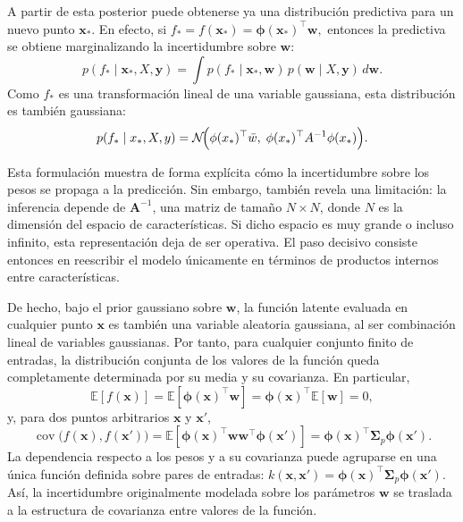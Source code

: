 A partir de esta posterior puede obtenerse ya una distribución predictiva para un nuevo
punto \(\bm{x}_*\). En efecto, si
$
f_* = f(\bm{x}_*)=\bm{\phi}(\bm{x}_*)^\top \bm{w},
$
entonces la predictiva se obtiene marginalizando la incertidumbre sobre \(\bm{w}\):
\[
p(f_*\mid \bm{x}_*,X,\bm{y})
=
\int p(f_*\mid \bm{x}_*,\bm{w})\,p(\bm{w}\mid X,\bm{y})\,d\bm{w}.
\]
Como \(f_*\) es una transformación lineal de una variable gaussiana, esta distribución es
también gaussiana:
\[
p(f_*\mid x_*,X,y)
=
\mathcal{N}\!\Bigl(
\phi(x_*)^\top \bar{w},
\;
\phi(x_*)^\top A^{-1}\phi(x_*)
\Bigr).
\]

Esta formulación muestra de forma explícita cómo la incertidumbre sobre los pesos se
propaga a la predicción. Sin embargo, también revela una limitación: la
inferencia depende de \(\bm{A}^{-1}\), una matriz de tamaño \(N\times N\), donde \(N\) es la
dimensión del espacio de características. Si dicho espacio es muy grande o incluso infinito,
esta representación deja de ser operativa. El paso decisivo consiste entonces en reescribir el
modelo únicamente en términos de productos internos entre características.

De hecho, bajo el prior gaussiano sobre \(\bm{w}\), la función latente evaluada en cualquier
punto \(\bm{x}\) es también una variable aleatoria gaussiana, al ser combinación lineal de
variables gaussianas. Por tanto, para cualquier conjunto finito de entradas, la distribución
conjunta de los valores de la función queda completamente determinada por su media y su
covarianza. En particular,
\[
\mathbb{E}[f(\bm{x})]
=
\mathbb{E}[\bm{\phi}(\bm{x})^\top\bm{w}]
=
\bm{\phi}(\bm{x})^\top\mathbb{E}[\bm{w}]
=
0,
\]
y, para dos puntos arbitrarios \(\bm{x}\) y \(\bm{x}'\),
\[
\operatorname{cov}\bigl(f(\bm{x}),f(\bm{x}')\bigr)
=
\mathbb{E}\!\left[
\bm{\phi}(\bm{x})^\top \bm{w}\bm{w}^\top \bm{\phi}(\bm{x}')
\right]
=
\bm{\phi}(\bm{x})^\top \bm{\Sigma}_p \bm{\phi}(\bm{x}').
\]
La dependencia respecto a los pesos y a su covarianza puede agruparse en una única función definida sobre pares de
entradas:
$
k(\bm{x},\bm{x}')
=
\bm{\phi}(\bm{x})^\top \bm{\Sigma}_p \bm{\phi}(\bm{x}').
$
Así, la incertidumbre originalmente modelada sobre los parámetros \(\bm{w}\) se traslada a la
estructura de covarianza entre valores de la función.

